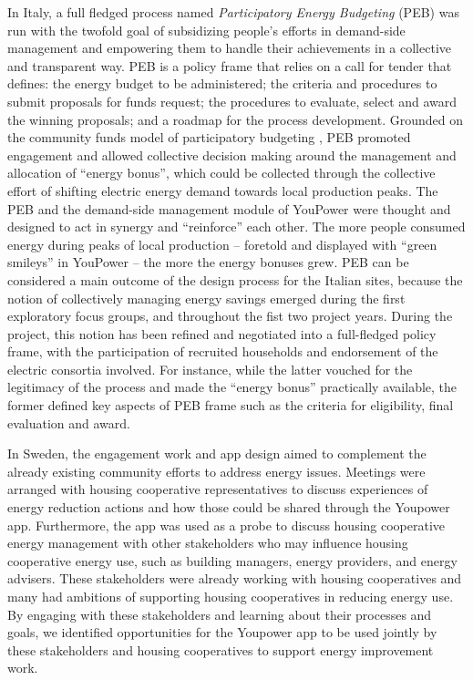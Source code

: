 In Italy, a full fledged process named \textit{Participatory Energy Budgeting} (PEB) \cite{capaccioli_exploring_2017,capaccioli_exploring_2016}
was run with the twofold goal of subsidizing people's efforts in demand-side management
and empowering them to handle their achievements in a collective and transparent way.
%
PEB is a policy frame that relies on a call for tender that
defines: the energy budget to be administered;
the criteria and procedures to submit proposals for funds request; the procedures
to evaluate, select and award the winning proposals; and a roadmap for the process development. 
Grounded on the community funds model of participatory budgeting \cite{Ganuza2012,Sintomer2008},
PEB promoted engagement and allowed collective decision
making around the management and allocation of ``energy bonus'', which could be
collected through the collective effort of shifting electric energy demand
towards local production peaks.
% 
The PEB and the demand-side management module of YouPower
were thought and designed to act in synergy and ``reinforce'' each other.
The more people consumed energy during peaks of local production -- foretold and displayed
with ``green smileys'' in YouPower -- the more the energy bonuses grew.
% 
PEB can be considered a main outcome of the design process for the Italian sites, because 
the notion of collectively managing energy savings emerged during the first exploratory focus groups,
and throughout the fist two project years. During the project, this notion has been refined and negotiated into
a full-fledged policy frame, with the participation of recruited households and endorsement
of the electric consortia involved. For instance, while the latter vouched for the legitimacy of the process
and made the ``energy bonus'' practically available, the former defined key aspects of PEB frame such as the criteria for eligibility, final evaluation and award.  


In Sweden, the engagement work and app design aimed to complement the already existing community efforts to address energy issues. Meetings were arranged with housing cooperative representatives to discuss experiences of energy reduction actions and how those could be shared through the Youpower app. Furthermore, the app was used as a probe to discuss housing cooperative energy management with other stakeholders who may influence housing cooperative energy use, such as building managers, energy providers, and energy advisers. These stakeholders were already working with housing cooperatives and many had ambitions of supporting housing cooperatives in reducing energy use. By engaging with these stakeholders and learning about their processes and goals, we identified opportunities for the Youpower app to be used jointly by these stakeholders and housing cooperatives to support energy improvement work.

